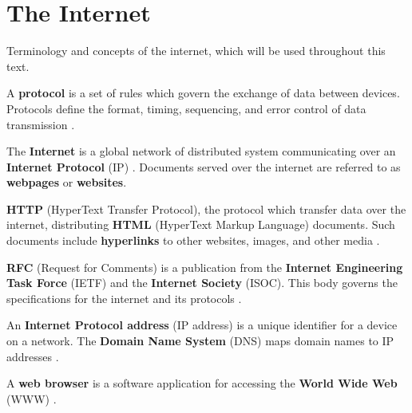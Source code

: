 \vspace{-1em}
\section{The Internet}

\noindent
Terminology and concepts of the internet, which will be used throughout this text.

\begin{Def}[Protocol]

    A \textbf{protocol} is a set of rules which govern the exchange of data between devices. 
    Protocols define the format, timing, sequencing, and error control of data transmission \cite{rfc791}.
\end{Def}

\begin{Def}[Internet]

    The \textbf{Internet} is a global network of distributed system communicating over an \textbf{Internet Protocol} (IP) \cite{cloudflare_internet_protocol}.
    Documents served over the internet are referred to as \textbf{webpages} or \textbf{websites}.
\end{Def}
\begin{Def}

    \textbf{HTTP} (HyperText Transfer Protocol), the protocol which transfer data over the internet, 
    distributing \textbf{HTML} (HyperText Markup Language) documents. Such 
    documents include \textbf{hyperlinks} to other websites, images, and other media \cite{rfc9110}.
\end{Def}
\begin{Def}

    \textbf{RFC} (Request for Comments) is a publication from the \textbf{Internet Engineering Task Force} (IETF) 
    and the \textbf{Internet Society} (ISOC). This body governs the specifications for the internet and its protocols \cite{rfc}.
\end{Def}

\begin{Def}

    An \textbf{Internet Protocol address} (IP address) is a unique identifier for a device on a network. 
    The \textbf{Domain Name System} (DNS) maps domain names to IP addresses \cite{rfc760}.
\end{Def}

\newpage

\begin{Def}

    A \textbf{web browser} is a software application for accessing the \textbf{World Wide Web} (WWW) \cite{ou_internet_history}.
\end{Def}

